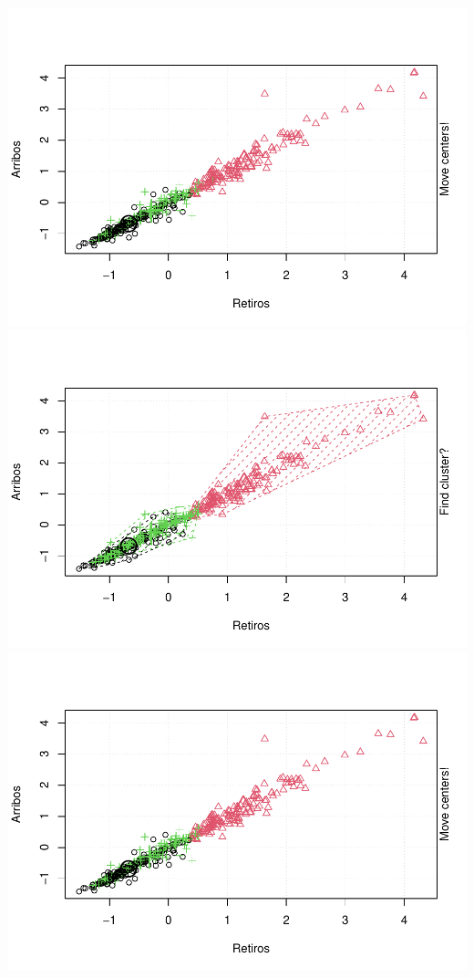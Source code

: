 \documentclass[
]{article}
\begin{document}
\includegraphics{Ecobici_files/figure-latex/unnamed-chunk-12-7.pdf}
\includegraphics{Ecobici_files/figure-latex/unnamed-chunk-12-8.pdf}
\includegraphics{Ecobici_files/figure-latex/unnamed-chunk-12-9.pdf}
\end{document}

